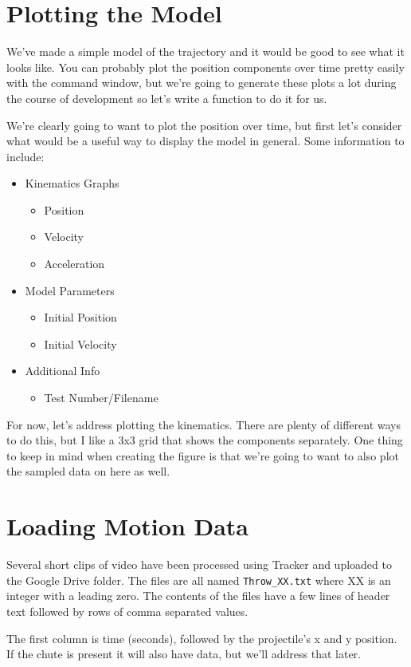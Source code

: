 \documentclass[12pt, letterpaper]{article}
\begin{document}
\section{Plotting the Model}
We've made a simple model of the trajectory and it would be good to see what it looks like. You can probably plot the position components over time pretty easily with the command window, but we're going to generate these plots a lot during the course of development so let's write a function to do it for us. 

We're clearly going to want to plot the position over time, but first let's consider what would be a useful way to display the model in general. Some information to include:
\begin{itemize}
\item Kinematics Graphs
\begin{itemize}
\item Position
\item Velocity
\item Acceleration
\end{itemize}
\item Model Parameters
\begin{itemize}
\item Initial Position
\item Initial Velocity
\end{itemize}
\item Additional Info
\begin{itemize}
\item Test Number/Filename
\end{itemize} 
\end{itemize}
For now, let's address plotting the kinematics. There are plenty of different ways to do this, but I like a 3x3 grid that shows the components separately. One thing to keep in mind when creating the figure is that we're going to want to also plot the sampled data on here as well.

\section{Loading Motion Data}
Several short clips of video have been processed using Tracker and uploaded to the Google Drive folder. The files are all named \texttt{Throw\_XX.txt} where XX is an integer with a leading zero. The contents of the files have a few lines of header text followed by rows of comma separated values. 

The first column is time (seconds), followed by the projectile's x and y position. If the chute is present it will also have data, but we'll address that later.
\end{document}
